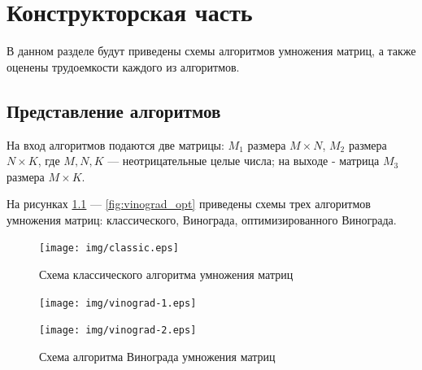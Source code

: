 \chapter{Конструкторская часть}
В данном разделе будут приведены схемы алгоритмов умножения матриц, а также оценены трудоемкости каждого из алгоритмов.

\section{Представление алгоритмов}

На вход алгоритмов подаются две матрицы: $M_{1}$ размера $M \times N$, $M_{2}$ размера $N \times K$, где $M, N, K$ --- неотрицательные целые числа; на выходе - матрица $M_{3}$ размера $M \times K$.

На рисунках \ref{fig:classic} --- \ref{fig:vinograd_opt} приведены схемы трех алгоритмов умножения матриц: классического, Винограда, оптимизированного Винограда.

\clearpage

\begin{figure}[h]
	\centering
	\texttt{[image: img/classic.eps]}
	\caption{Схема классического алгоритма умножения матриц}
	\label{fig:classic}
\end{figure}

\clearpage

\begin{figure}[h]
	\centering
	\texttt{[image: img/vinograd-1.eps]}
	\label{fig:vinograd-1}
\end{figure}
\begin{figure}[h]
	\centering
    \texttt{[image: img/vinograd-2.eps]}
	\caption{Схема алгоритма Винограда умножения матриц}
	\label{fig:vinograd}
\end{figure}

\clearpage

